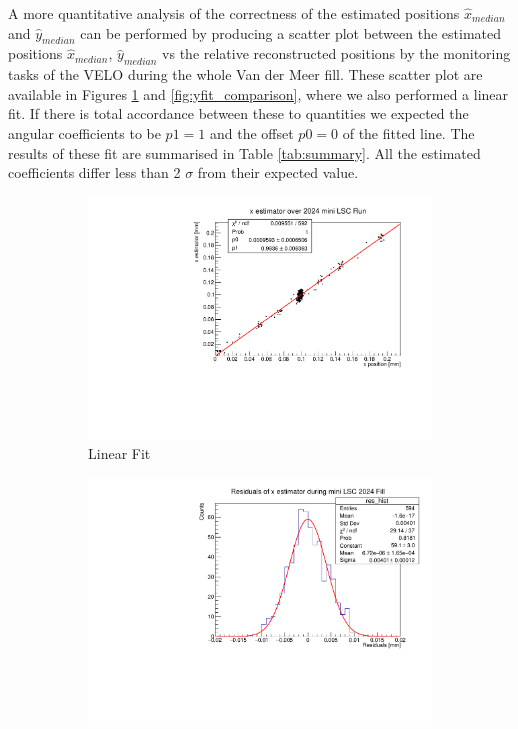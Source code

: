 A more quantitative analysis of the correctness of the estimated positions $\hat{x}_{median}$ and $\hat{y}_{median}$ can be performed by producing a scatter plot between the estimated positions $\hat{x}_{median}$, $\hat{y}_{median}$ vs the relative reconstructed positions by the monitoring tasks of the VELO during the whole Van der Meer fill. These scatter plot are available in Figures \ref{fig:xfit_comparison} and \ref{fig:yfit_comparison}, where we also performed a linear fit. If there is total accordance between these to quantities we expected the angular coefficients to be $p1=1$ and the offset $p0=0$ of the fitted line. 
The results of these fit are summarised in Table \ref{tab:summary}. All the estimated coefficients differ less than 2 $\sigma$ from their expected value. 


\begin{figure}
    \centering
    \begin{subfigure}{0.48\textwidth}
    \includegraphics[width=\linewidth]{figures/x_comparison_side.pdf}
    \caption{Linear Fit}\label{fig:xfit_comparison}
    \end{subfigure}
    \begin{subfigure}{0.48\textwidth}
    \includegraphics[width=\linewidth]{figures/x_comparison_res_side.pdf}

\end{subfigure}
\end{figure}
